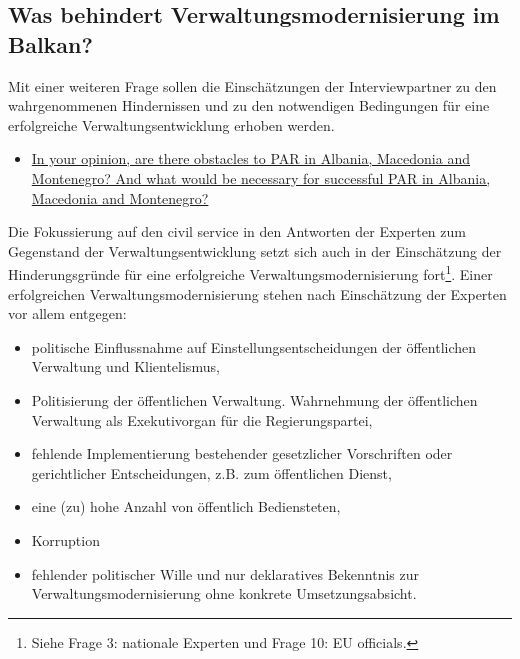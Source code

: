 \subsection{Was behindert Verwaltungsmodernisierung im Balkan? }
Mit einer weiteren Frage sollen die Einschätzungen der Interviewpartner zu den wahrgenommenen Hindernissen und zu den notwendigen Bedingungen für eine erfolgreiche Verwaltungsentwicklung erhoben werden.
\begin{itemize}[label={}]
\item \ul{In your opinion, are there obstacles to PAR in Albania, Macedonia and Montenegro? And what would be necessary for successful PAR in Albania, Macedonia and Montenegro?}
\end{itemize}
Die Fokussierung auf den civil service in den Antworten der Experten zum Gegenstand der Verwaltungsentwicklung setzt sich auch in der Einschätzung der Hinderungsgründe für eine erfolgreiche Verwaltungsmodernisierung fort\footnote{Siehe Frage 3: nationale Experten und Frage 10: EU officials.}. Einer erfolgreichen Verwaltungsmodernisierung stehen nach Einschätzung der Experten vor allem entgegen:
\begin{itemize}
\item politische Einflussnahme auf Einstellungsentscheidungen der öffentlichen Verwaltung und Klientelismus,
\item Politisierung der öffentlichen Verwaltung. Wahrnehmung der öffentlichen Verwaltung als Exekutivorgan für die Regierungspartei, 
\item fehlende Implementierung bestehender gesetzlicher Vorschriften oder gerichtlicher Entscheidungen, z.B. zum öffentlichen Dienst, 
\item eine (zu) hohe Anzahl von öffentlich Bediensteten, 
\item Korruption 
\item fehlender politischer Wille und nur deklaratives Bekenntnis zur Verwaltungsmodernisierung ohne konkrete Umsetzungsabsicht.
\end{itemize}

